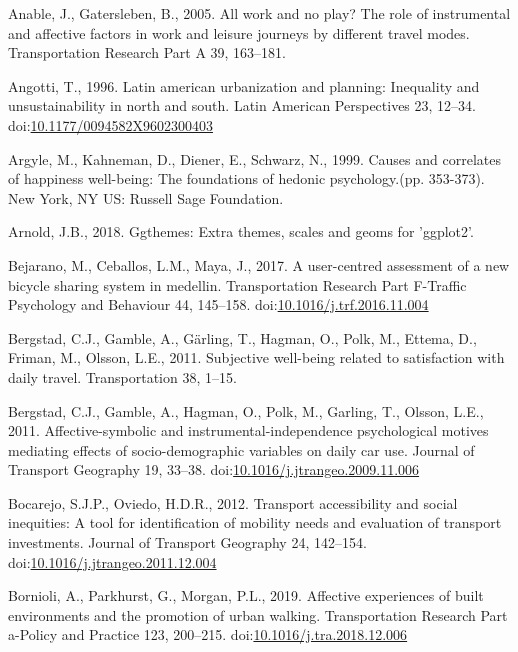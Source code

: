 \documentclass[]{elsarticle} %
\begin{document}
\leavevmode\hypertarget{ref-Anable2005work}{}%
Anable, J., Gatersleben, B., 2005. All work and no play? The role of
instrumental and affective factors in work and leisure journeys by
different travel modes. Transportation Research Part A 39, 163--181.

\leavevmode\hypertarget{ref-Angotti1996latin}{}%
Angotti, T., 1996. Latin american urbanization and planning: Inequality
and unsustainability in north and south. Latin American Perspectives 23,
12--34.
doi:\href{https://doi.org/10.1177/0094582X9602300403}{10.1177/0094582X9602300403}

\leavevmode\hypertarget{ref-Argyle1999causes}{}%
Argyle, M., Kahneman, D., Diener, E., Schwarz, N., 1999. Causes and
correlates of happiness well-being: The foundations of hedonic
psychology.(pp. 353-373). New York, NY US: Russell Sage Foundation.

\leavevmode\hypertarget{ref-Arnold2018}{}%
Arnold, J.B., 2018. Ggthemes: Extra themes, scales and geoms for
'ggplot2'.

\leavevmode\hypertarget{ref-Bejarano2017user}{}%
Bejarano, M., Ceballos, L.M., Maya, J., 2017. A user-centred assessment
of a new bicycle sharing system in medellin. Transportation Research
Part F-Traffic Psychology and Behaviour 44, 145--158.
doi:\href{https://doi.org/10.1016/j.trf.2016.11.004}{10.1016/j.trf.2016.11.004}

\leavevmode\hypertarget{ref-Bergstad2011subjective}{}%
Bergstad, C.J., Gamble, A., Gärling, T., Hagman, O., Polk, M., Ettema,
D., Friman, M., Olsson, L.E., 2011. Subjective well-being related to
satisfaction with daily travel. Transportation 38, 1--15.

\leavevmode\hypertarget{ref-Bergstad2011affective}{}%
Bergstad, C.J., Gamble, A., Hagman, O., Polk, M., Garling, T., Olsson,
L.E., 2011. Affective-symbolic and instrumental-independence
psychological motives mediating effects of socio-demographic variables
on daily car use. Journal of Transport Geography 19, 33--38.
doi:\href{https://doi.org/10.1016/j.jtrangeo.2009.11.006}{10.1016/j.jtrangeo.2009.11.006}

\leavevmode\hypertarget{ref-Bocarejo2012transport}{}%
Bocarejo, S.J.P., Oviedo, H.D.R., 2012. Transport accessibility and
social inequities: A tool for identification of mobility needs and
evaluation of transport investments. Journal of Transport Geography 24,
142--154.
doi:\href{https://doi.org/10.1016/j.jtrangeo.2011.12.004}{10.1016/j.jtrangeo.2011.12.004}

\leavevmode\hypertarget{ref-Bornioli2019affective}{}%
Bornioli, A., Parkhurst, G., Morgan, P.L., 2019. Affective experiences
of built environments and the promotion of urban walking. Transportation
Research Part a-Policy and Practice 123, 200--215.
doi:\href{https://doi.org/10.1016/j.tra.2018.12.006}{10.1016/j.tra.2018.12.006}
\end{document}
